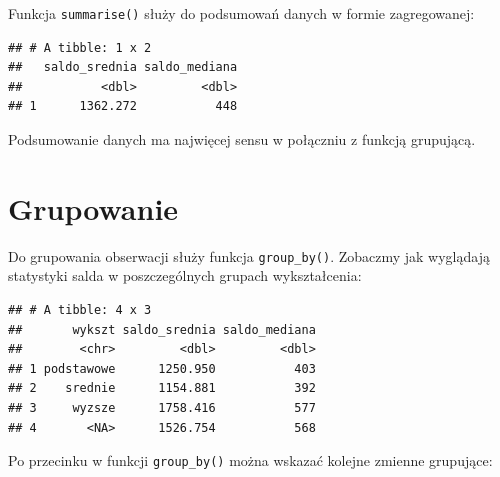 \documentclass[]{book}
\newenvironment{Shaded}{\begin{snugshade}}{\end{snugshade}}
\newcommand{\KeywordTok}[1]{\textcolor[rgb]{0.13,0.29,0.53}{\textbf{#1}}}
\newcommand{\DataTypeTok}[1]{\textcolor[rgb]{0.13,0.29,0.53}{#1}}
\newcommand{\StringTok}[1]{\textcolor[rgb]{0.31,0.60,0.02}{#1}}
\newcommand{\OperatorTok}[1]{\textcolor[rgb]{0.81,0.36,0.00}{\textbf{#1}}}
\newcommand{\NormalTok}[1]{#1}
\begin{document}
Funkcja \texttt{summarise()} służy do podsumowań danych w formie
zagregowanej:

\begin{Shaded}
\end{Shaded}

\begin{verbatim}
## # A tibble: 1 x 2
##   saldo_srednia saldo_mediana
##           <dbl>         <dbl>
## 1      1362.272           448
\end{verbatim}

Podsumowanie danych ma najwięcej sensu w połączniu z funkcją grupującą.

\section{Grupowanie}\label{grupowanie}

Do grupowania obserwacji służy funkcja \texttt{group\_by()}. Zobaczmy
jak wyglądają statystyki salda w poszczególnych grupach wykształcenia:

\begin{Shaded}
\end{Shaded}

\begin{verbatim}
## # A tibble: 4 x 3
##       wykszt saldo_srednia saldo_mediana
##        <chr>         <dbl>         <dbl>
## 1 podstawowe      1250.950           403
## 2    srednie      1154.881           392
## 3     wyzsze      1758.416           577
## 4       <NA>      1526.754           568
\end{verbatim}

Po przecinku w funkcji \texttt{group\_by()} można wskazać kolejne
zmienne grupujące:

\begin{Shaded}
\end{Shaded}
\end{document}
